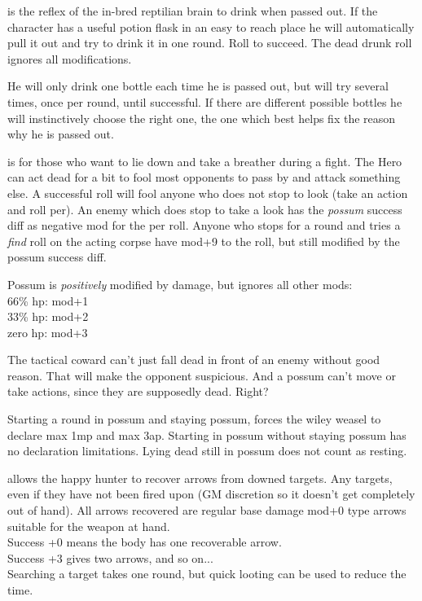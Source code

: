  is the reflex of the in-bred reptilian brain to drink when passed out. If the character has a useful potion flask in an easy to reach place he will automatically pull it out and try to drink it in one round. Roll to succeed. The dead drunk roll ignores all modifications.

He will only drink one bottle each time he is passed out, but will try several times, once per round, until successful. If there are different possible bottles he will instinctively choose the right one, the one which best helps fix the reason why he is passed out.


 is for those who want to lie down and take a breather during a fight. The Hero can act dead for a bit to fool most opponents to pass by and attack something else. A successful roll will fool anyone who does not stop to look (take an action and roll per). An enemy which does stop to take a look has the \emph{possum} success diff as negative mod for the per roll. Anyone who stops for a round and tries a \emph{find} roll on the acting corpse have mod+9 to the roll, but still modified by the possum success diff.

Possum is \emph{positively} modified by damage, but ignores all other mods:\\
66\% hp: mod+1\\
33\% hp: mod+2\\
zero hp: mod+3

The tactical coward can't just fall dead in front of an enemy without good reason. That will make the opponent suspicious. And a possum can't move or take actions, since they are supposedly dead. Right?

Starting a round in possum and staying possum, forces the wiley weasel to declare max 1mp and max 3ap. Starting in possum without staying possum has no declaration limitations. Lying dead still in possum does not count as resting.


 allows the happy hunter to recover arrows from downed targets. Any targets, even if they have not been fired upon (GM discretion so it doesn't get completely out of hand). All arrows recovered are regular base damage mod+0 type arrows suitable for the weapon at hand.\\
Success +0 means the body has one recoverable arrow. \\
Success +3 gives two arrows, and so on...\\
Searching a target takes one round, but quick looting can be used to reduce the time.

